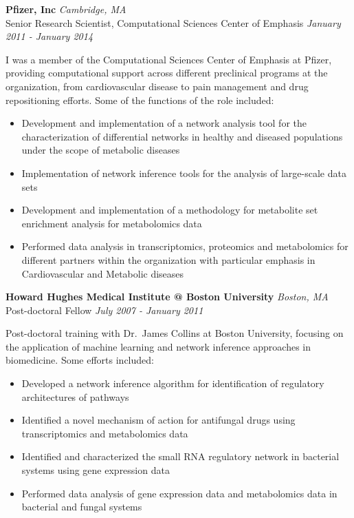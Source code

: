 \documentclass[11pt, a4paper]{awesome-cv}
\providecommand{\tightlist}{%
	\setlength{\itemsep}{0pt}\setlength{\parskip}{0pt}}
\begin{document}
\textbf{{Pfizer, Inc}} \hfill \emph{Cambridge, MA}\\
Senior Research Scientist, Computational Sciences Center of Emphasis
\hfill \emph{January 2011 - January 2014}

I was a member of the Computational Sciences Center of Emphasis at
Pfizer, providing computational support across different preclinical
programs at the organization, from cardiovascular disease to pain
management and drug repositioning efforts. Some of the functions of the
role included:

\begin{itemize}
\tightlist
\item
  Development and implementation of a network analysis tool for the
  characterization of differential networks in healthy and diseased
  populations under the scope of metabolic diseases
\item
  Implementation of network inference tools for the analysis of
  large-scale data sets
\item
  Development and implementation of a methodology for metabolite set
  enrichment analysis for metabolomics data
\item
  Performed data analysis in transcriptomics, proteomics and
  metabolomics for different partners within the organization with
  particular emphasis in Cardiovascular and Metabolic diseases
\end{itemize}

\textbf{{Howard Hughes Medical Institute @ Boston University}}
\hfill \emph{Boston, MA}\\
Post-doctoral Fellow \hfill \emph{July 2007 - January 2011}

Post-doctoral training with Dr.~James Collins at Boston University,
focusing on the application of machine learning and network inference
approaches in biomedicine. Some efforts included:

\begin{itemize}
\tightlist
\item
  Developed a network inference algorithm for identification of
  regulatory architectures of pathways
\item
  Identified a novel mechanism of action for antifungal drugs using
  transcriptomics and metabolomics data
\item
  Identified and characterized the small RNA regulatory network in
  bacterial systems using gene expression data
\item
  Performed data analysis of gene expression data and metabolomics data
  in bacterial and fungal systems
\end{itemize}
\end{document}

